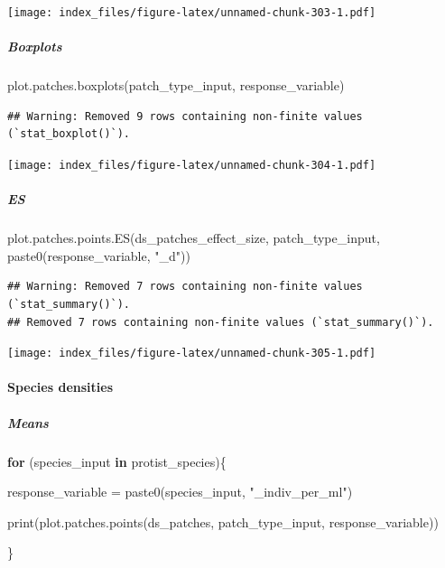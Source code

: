 \documentclass[
]{article}
\newenvironment{Shaded}{\begin{snugshade}}{\end{snugshade}}
\newcommand{\ControlFlowTok}[1]{\textcolor[rgb]{0.13,0.29,0.53}{\textbf{#1}}}
\newcommand{\FunctionTok}[1]{\textcolor[rgb]{0.00,0.00,0.00}{#1}}
\newcommand{\NormalTok}[1]{#1}
\newcommand{\OtherTok}[1]{\textcolor[rgb]{0.56,0.35,0.01}{#1}}
\newcommand{\StringTok}[1]{\textcolor[rgb]{0.31,0.60,0.02}{#1}}
\begin{document}
\texttt{[image: index\_files/figure-latex/unnamed-chunk-303-1.pdf]}

\hypertarget{boxplots-18}{%
\subparagraph{Boxplots}\label{boxplots-18}}

\begin{Shaded}
\begin{Highlighting}[]
\FunctionTok{plot.patches.boxplots}\NormalTok{(patch\_type\_input,}
\NormalTok{                       response\_variable)}
\end{Highlighting}
\end{Shaded}

\begin{verbatim}
## Warning: Removed 9 rows containing non-finite values (`stat_boxplot()`).
\end{verbatim}

\texttt{[image: index\_files/figure-latex/unnamed-chunk-304-1.pdf]}

\hypertarget{es-3}{%
\subparagraph{ES}\label{es-3}}

\begin{Shaded}
\begin{Highlighting}[]
\FunctionTok{plot.patches.points.ES}\NormalTok{(ds\_patches\_effect\_size, patch\_type\_input,}
                       \FunctionTok{paste0}\NormalTok{(response\_variable, }\StringTok{"\_d"}\NormalTok{))}
\end{Highlighting}
\end{Shaded}

\begin{verbatim}
## Warning: Removed 7 rows containing non-finite values (`stat_summary()`).
## Removed 7 rows containing non-finite values (`stat_summary()`).
\end{verbatim}

\texttt{[image: index\_files/figure-latex/unnamed-chunk-305-1.pdf]}

\hypertarget{species-densities-1}{%
\paragraph{Species densities}\label{species-densities-1}}

\hypertarget{means-20}{%
\subparagraph{Means}\label{means-20}}

\begin{Shaded}
\begin{Highlighting}[]
\ControlFlowTok{for}\NormalTok{ (species\_input }\ControlFlowTok{in}\NormalTok{ protist\_species)\{}
  
\NormalTok{  response\_variable }\OtherTok{=} \FunctionTok{paste0}\NormalTok{(species\_input, }\StringTok{"\_indiv\_per\_ml"}\NormalTok{)}
  
  \FunctionTok{print}\NormalTok{(}\FunctionTok{plot.patches.points}\NormalTok{(ds\_patches, patch\_type\_input,}
\NormalTok{                              response\_variable))}
  
\NormalTok{\}}
\end{Highlighting}
\end{Shaded}
\end{document}
